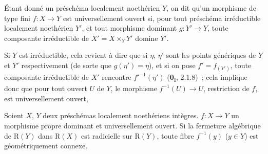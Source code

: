 \begin{definition}[4.3.9]
\label{III.4.3.9-fr}
Étant donné un préschéma localement noethérien $Y$, on dit qu'un morphisme \textup{de
type fini} $f:X\to Y$ est universellement ouvert si, pour tout
préschéma irréductible localement noethérien $Y'$, et tout morphisme dominant
$g:Y'\to Y$, toute composante irréductible de $X'=X\times_YY'$ domine $Y'$.
\end{definition}

Si $Y$ est irréductible, cela revient à dire que si $\eta$, $\eta'$ sont les
points génériques de $Y$ et $Y'$ respectivement (de sorte que
$g(\eta')=\eta$), et si on pose $f'=f_{(Y')}$, toute composante irréductible
de $X'$ rencontre $f'^{-1}(\eta')$ (\textbf{0}\textsubscript{I}, 2.1.8)~; cela
implique donc que pour tout ouvert $U$ de $Y$, le morphisme
$f^{-1}(U)\to U$, restriction de $f$, est universellement ouvert,

\begin{corollary}[4.3.10]
\label{III.4.3.10-fr}
Soient $X$, $Y$ deux préschémas localement noethériens intègres.
$f:X\to Y$ un morphisme propre dominant et universellement ouvert. Si la
fermeture algébrique de $\mathrm R(Y)$ dans $\mathrm R(X)$ est radicielle
sur $\mathrm R(Y)$, toute fibre $f^{-1}(y)$ ($y\in Y$) est géométriquement
connexe.
\end{corollary}

